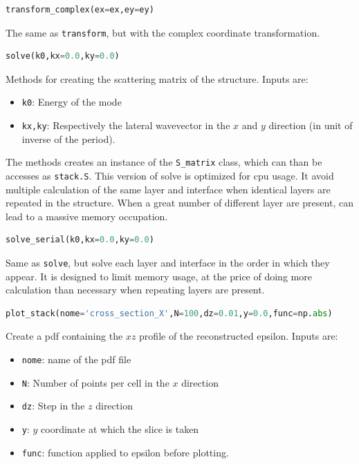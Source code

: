 \documentclass[a4paper,10pt]{report}
\begin{document}
\begin{lstlisting}[language=Python,basicstyle=\ttfamily\Large]
transform_complex(ex=ex,ey=ey)
\end{lstlisting}
The same as \texttt{transform}, but with the complex coordinate transformation. 

\begin{lstlisting}[language=Python,basicstyle=\ttfamily\Large]
solve(k0,kx=0.0,ky=0.0)
\end{lstlisting}
Methods for creating the scattering matrix of the structure. Inputs are:
\begin{itemize}[noitemsep,topsep=0pt,parsep=0pt,partopsep=0pt]
\item \texttt{k0}: Energy of the mode
\item \texttt{kx,ky}: Respectively the lateral wavevector in the $x$ and $y$ direction (in unit of inverse of the period).
\end{itemize}
The methods creates an instance of the \texttt{S\_matrix} class, which can than be accesses as \texttt{stack.S}.
This version of solve is optimized for cpu usage. It avoid multiple calculation of the same layer and interface when identical layers are repeated in the structure. When a great number of different layer are present, can lead to a massive memory occupation. 

\begin{lstlisting}[language=Python,basicstyle=\ttfamily\Large]
solve_serial(k0,kx=0.0,ky=0.0)
\end{lstlisting}
Same as \texttt{solve}, but solve each layer and interface in the order in which they appear. It is designed to limit memory usage, at the price of doing more calculation than necessary when repeating layers are present. 

\begin{lstlisting}[language=Python,basicstyle=\ttfamily\small]
plot_stack(nome='cross_section_X',N=100,dz=0.01,y=0.0,func=np.abs)
\end{lstlisting}
Create a pdf containing the $xz$ profile of the reconstructed epsilon. Inputs are: 
\begin{itemize}[noitemsep,topsep=0pt,parsep=0pt,partopsep=0pt]
\item \texttt{nome}: name of the pdf file
\item \texttt{N}: Number of points per cell in the $x$ direction
\item \texttt{dz}: Step in the $z$ direction
\item \texttt{y}: $y$ coordinate at which the slice is taken
\item \texttt{func}: function applied to epsilon before plotting. 
\end{itemize}
\end{document}
